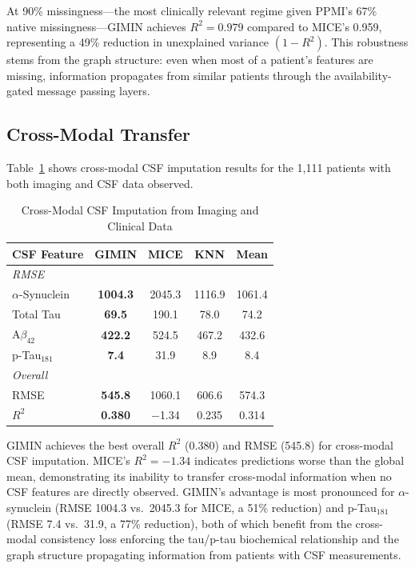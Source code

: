 \documentclass[journal,twoside,web]{ieeecolor}
\begin{document}
At 90\% missingness---the most clinically relevant regime given PPMI's 67\% native missingness---GIMIN achieves $R^2 = 0.979$ compared to MICE's 0.959, representing a 49\% reduction in unexplained variance $(1 - R^2)$. This robustness stems from the graph structure: even when most of a patient's features are missing, information propagates from similar patients through the availability-gated message passing layers.

\subsection{Cross-Modal Transfer}

Table~\ref{tab:crossmodal} shows cross-modal CSF imputation results for the 1{,}111 patients with both imaging and CSF data observed.

\begin{table}[t]
\centering
\caption{Cross-Modal CSF Imputation from Imaging and Clinical Data}
\label{tab:crossmodal}
\begin{tabular}{lcccc}
\toprule
\textbf{CSF Feature} & \textbf{GIMIN} & \textbf{MICE} & \textbf{KNN} & \textbf{Mean} \\
\midrule
\multicolumn{5}{l}{\textit{RMSE}} \\
$\alpha$-Synuclein   & \textbf{1004.3} & 2045.3 & 1116.9 & 1061.4 \\
Total Tau            & \textbf{69.5}   & 190.1  & 78.0   & 74.2   \\
A$\beta_{42}$        & \textbf{422.2}  & 524.5  & 467.2  & 432.6  \\
p-Tau$_{181}$        & \textbf{7.4}    & 31.9   & 8.9    & 8.4    \\
\midrule
\multicolumn{5}{l}{\textit{Overall}} \\
RMSE                 & \textbf{545.8}  & 1060.1 & 606.6  & 574.3  \\
$R^2$                & \textbf{0.380}  & $-$1.34 & 0.235 & 0.314  \\
\bottomrule
\end{tabular}
\end{table}

GIMIN achieves the best overall $R^2$ (0.380) and RMSE (545.8) for cross-modal CSF imputation. MICE's $R^2 = -1.34$ indicates predictions worse than the global mean, demonstrating its inability to transfer cross-modal information when no CSF features are directly observed. GIMIN's advantage is most pronounced for $\alpha$-synuclein (RMSE 1004.3 vs.\ 2045.3 for MICE, a 51\% reduction) and p-Tau$_{181}$ (RMSE 7.4 vs.\ 31.9, a 77\% reduction), both of which benefit from the cross-modal consistency loss enforcing the tau/p-tau biochemical relationship and the graph structure propagating information from patients with CSF measurements.
\end{document}

